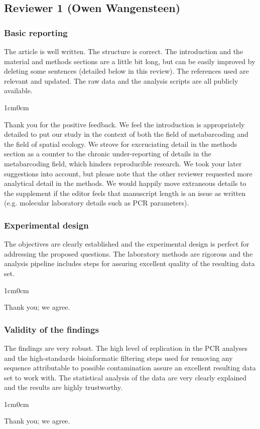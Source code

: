 \documentclass{article}
\newenvironment{response}
	{
	\begin{adjustwidth}{1cm}{0cm}
	\color{peerjBlue}
	}
	{
	\end{adjustwidth}
	}
\begin{document}
\subsection*{Reviewer 1 (Owen Wangensteen)}

\subsubsection*{Basic reporting}
The article is well written. The structure is correct. The introduction and the material and methods sections are a little bit long, but can be easily improved by deleting some sentences (detailed below in this review). The references used are relevant and updated. The raw data and the analysis scripts are all publicly available.
\begin{response}
	Thank you for the positive feedback.
	We feel the introduction is appropriately detailed to put our study in the context of both the field of metabarcoding and the field of spatial ecology.
	We strove for excruciating detail in the methods section as a counter to the chronic under-reporting of details in the metabarcoding field, which hinders reproducible research.
	We took your later suggestions into account, but please note that the other reviewer requested more analytical detail in the methods.
	We would happily move extraneous details to the supplement if the editor feels that manuscript length is an issue as written (e.g. molecular laboratory details such as PCR parameters).\\
\end{response}

\subsubsection*{Experimental design}
The objectives are clearly established and the experimental design is perfect for addressing the proposed questions. The laboratory methods are rigorous and the analysis pipeline includes steps for assuring excellent quality of the resulting data set.
\begin{response}
	Thank you; we agree.\\
\end{response}

\subsubsection*{Validity of the findings}
The findings are very robust. The high level of replication in the PCR analyses and the high-standards bioinformatic filtering steps used for removing any sequence attributable to possible contamination assure an excellent resulting data set to work with. The statistical analysis of the data are very clearly explained and the results are highly trustworthy.
\begin{response}
	Thank you; we agree.\\
\end{response}
\end{document}

